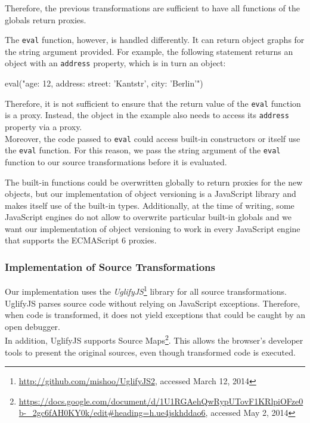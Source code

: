 Therefore, the previous transformations are sufficient to have all functions of the globals return proxies.

The \lstinline{eval} function, however, is handled differently.
It can return object graphs for the string argument provided.
For example, the following statement returns an object with an \lstinline{address} property, which is in turn an object:

\begin{code}{}{}
eval("{age: 12, address: {street: 'Kantstr', city: 'Berlin'}}")
\end{code}
\iffalse
\end{verbatim}\fi

Therefore, it is not sufficient to ensure that the return value of the \lstinline{eval} function is a proxy.
Instead, the object in the example also needs to access its \lstinline{address} property via a proxy.\\
Moreover, the code passed to \lstinline{eval} could access built-in constructors or itself use the \lstinline{eval} function.
For this reason, we pass the string argument of the \lstinline{eval} function to our source transformations before it is evaluated.

The built-in functions could be overwritten globally to return proxies for the new objects, but our implementation of object versioning is a JavaScript library and makes itself use of the built-in types.
Additionally, at the time of writing, some JavaScript engines do not allow to overwrite particular built-in globals and we want our implementation of object versioning to work in every JavaScript engine that supports the ECMAScript 6 proxies.

\subsubsection{Implementation of Source Transformations}

Our implementation uses the \emph{UglifyJS}\footnote{\url{http://github.com/mishoo/UglifyJS2}, accessed March 12, 2014} library for all source transformations.
UglifyJS parses source code without relying on JavaScript exceptions.
Therefore, when code is transformed, it does not yield exceptions that could be caught by an open debugger.\\
In addition, UglifyJS supports Source Maps\footnote{\url{https://docs.google.com/document/d/1U1RGAehQwRypUTovF1KRlpiOFze0b-_2gc6fAH0KY0k/edit\#heading=h.ue4jskhddao6}, accessed May 2, 2014}.
This allows the browser's developer tools to present the original sources, even though transformed code is executed.





